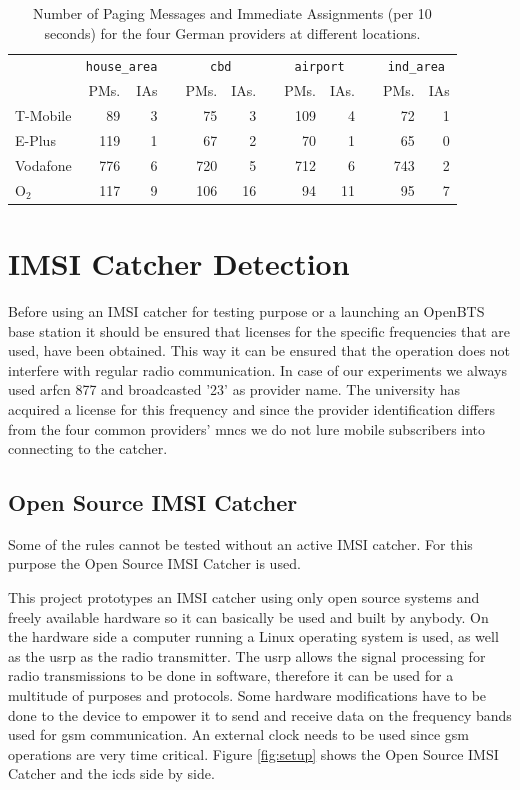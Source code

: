 \begin{table}
\centering
\begin{tabular}{lrrcrrcrrcrr}
\toprule
& \multicolumn{2}{c}{\texttt{house\_area}} &\phantom{a}& \multicolumn{2}{c}{\texttt{cbd}} &\phantom{a} & \multicolumn{2}{c}{\texttt{airport}}&\phantom{a} & \multicolumn{2}{c}{\texttt{ind\_area}}\\
\cmidrule{2-3} \cmidrule{5-6} \cmidrule{8-9} \cmidrule{11-12}
&PMs.&IAs&	&PMs. &IAs.&	&PMs.&IAs.&&PMs.&IAs\\
\midrule
T-Mobile&		89&3&	&75&3&	&109&4&&72&1\\
E-Plus&		119&1&	&67&2&	&70&1&&65&0\\
Vodafone&		776&6&	&720&5&	&712&6&&743&2\\
O$_{2}$&		117&9&	&106&16&	&94&11&&95&7\\
\bottomrule
\end{tabular}
\caption{Number of Paging Messages and Immediate Assignments (per 10 seconds) for the four German providers at different locations.}
\label{tab:pagings}
\end{table}

\section{IMSI Catcher Detection}
Before using an IMSI catcher for testing purpose or a launching an OpenBTS base station it should be ensured that licenses for the specific frequencies that are used, have been obtained.
This way it can be ensured that the operation does not interfere with regular radio communication.
In case of our experiments we always used \gls{arfcn} 877 and broadcasted '23' as provider name.
The university has acquired a license for this frequency and since the provider identification differs from the four common providers' \glspl{mnc} we do not lure mobile subscribers into connecting to the catcher.

\subsection{Open Source IMSI Catcher}
Some of the rules cannot be tested without an active IMSI catcher.
For this purpose the Open Source IMSI Catcher \cite{dennis} is used.

This project prototypes an IMSI catcher using only open source systems and freely available hardware so it can basically be used and built by anybody.
On the hardware side a computer running a Linux operating system is used, as well as the \gls{usrp} as the radio transmitter.
The \gls{usrp} allows the signal processing for radio transmissions to be done in software, therefore it can be used for a multitude of purposes and protocols.
Some hardware modifications have to be done to the device to empower it to send and receive data on the frequency bands used for \gls{gsm} communication.
An external clock needs to be used since \gls{gsm} operations are very time critical.
Figure \ref{fig:setup} shows the Open Source IMSI Catcher and the \gls{icds} side by side.

